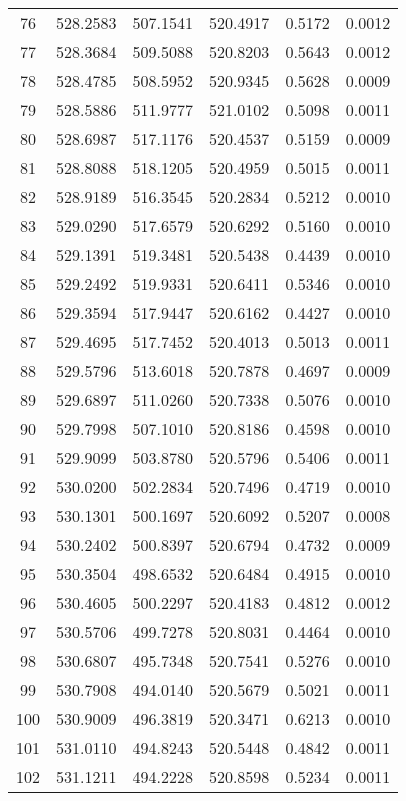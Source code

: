 \documentclass{article}
\begin{document}
\begin{longtable}{|c|c|c|c|c|c|}
76 & 528.2583 & 507.1541 & 520.4917 & 0.5172 & 0.0012 \\
77 & 528.3684 & 509.5088 & 520.8203 & 0.5643 & 0.0012 \\
78 & 528.4785 & 508.5952 & 520.9345 & 0.5628 & 0.0009 \\
79 & 528.5886 & 511.9777 & 521.0102 & 0.5098 & 0.0011 \\
80 & 528.6987 & 517.1176 & 520.4537 & 0.5159 & 0.0009 \\
81 & 528.8088 & 518.1205 & 520.4959 & 0.5015 & 0.0011 \\
82 & 528.9189 & 516.3545 & 520.2834 & 0.5212 & 0.0010 \\
83 & 529.0290 & 517.6579 & 520.6292 & 0.5160 & 0.0010 \\
84 & 529.1391 & 519.3481 & 520.5438 & 0.4439 & 0.0010 \\
85 & 529.2492 & 519.9331 & 520.6411 & 0.5346 & 0.0010 \\
86 & 529.3594 & 517.9447 & 520.6162 & 0.4427 & 0.0010 \\
87 & 529.4695 & 517.7452 & 520.4013 & 0.5013 & 0.0011 \\
88 & 529.5796 & 513.6018 & 520.7878 & 0.4697 & 0.0009 \\
89 & 529.6897 & 511.0260 & 520.7338 & 0.5076 & 0.0010 \\
90 & 529.7998 & 507.1010 & 520.8186 & 0.4598 & 0.0010 \\
91 & 529.9099 & 503.8780 & 520.5796 & 0.5406 & 0.0011 \\
92 & 530.0200 & 502.2834 & 520.7496 & 0.4719 & 0.0010 \\
93 & 530.1301 & 500.1697 & 520.6092 & 0.5207 & 0.0008 \\
94 & 530.2402 & 500.8397 & 520.6794 & 0.4732 & 0.0009 \\
95 & 530.3504 & 498.6532 & 520.6484 & 0.4915 & 0.0010 \\
96 & 530.4605 & 500.2297 & 520.4183 & 0.4812 & 0.0012 \\
97 & 530.5706 & 499.7278 & 520.8031 & 0.4464 & 0.0010 \\
98 & 530.6807 & 495.7348 & 520.7541 & 0.5276 & 0.0010 \\
99 & 530.7908 & 494.0140 & 520.5679 & 0.5021 & 0.0011 \\
100 & 530.9009 & 496.3819 & 520.3471 & 0.6213 & 0.0010 \\
101 & 531.0110 & 494.8243 & 520.5448 & 0.4842 & 0.0011 \\
102 & 531.1211 & 494.2228 & 520.8598 & 0.5234 & 0.0011 \\

\end{longtable}
\end{document}

